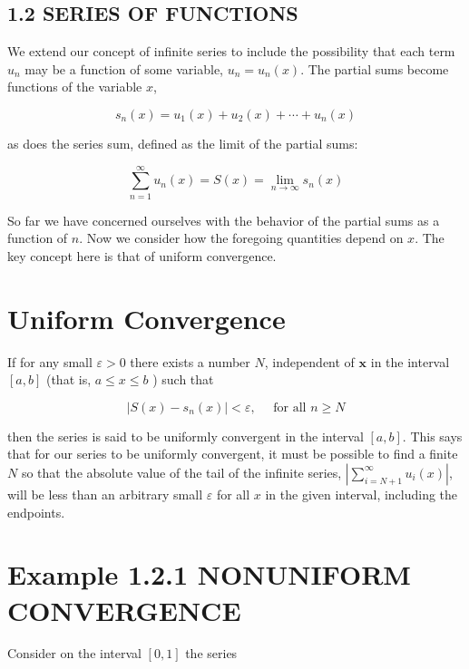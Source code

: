\documentclass[10pt]{article}
\begin{document}
\subsection*{1.2 SERIES OF FUNCTIONS}
We extend our concept of infinite series to include the possibility that each term $u_{n}$ may be a function of some variable, $u_{n}=u_{n}(x)$. The partial sums become functions of the variable $x$,


\begin{equation*}
s_{n}(x)=u_{1}(x)+u_{2}(x)+\cdots+u_{n}(x) \tag{1.32}
\end{equation*}


as does the series sum, defined as the limit of the partial sums:


\begin{equation*}
\sum_{n=1}^{\infty} u_{n}(x)=S(x)=\lim _{n \rightarrow \infty} s_{n}(x) \tag{1.33}
\end{equation*}


So far we have concerned ourselves with the behavior of the partial sums as a function of $n$. Now we consider how the foregoing quantities depend on $x$. The key concept here is that of uniform convergence.

\section*{Uniform Convergence}
If for any small $\varepsilon>0$ there exists a number $N$, independent of $\boldsymbol{x}$ in the interval $[a, b]$ (that is, $a \leq x \leq b$ ) such that


\begin{equation*}
\left|S(x)-s_{n}(x)\right|<\varepsilon, \quad \text { for all } n \geq N \tag{1.34}
\end{equation*}


then the series is said to be uniformly convergent in the interval $[a, b]$. This says that for our series to be uniformly convergent, it must be possible to find a finite $N$ so that the absolute value of the tail of the infinite series, $\left|\sum_{i=N+1}^{\infty} u_{i}(x)\right|$, will be less than an arbitrary small $\varepsilon$ for all $x$ in the given interval, including the endpoints.

\section*{Example 1.2.1 NONUNIFORM CONVERGENCE}
Consider on the interval $[0,1]$ the series
\end{document}
